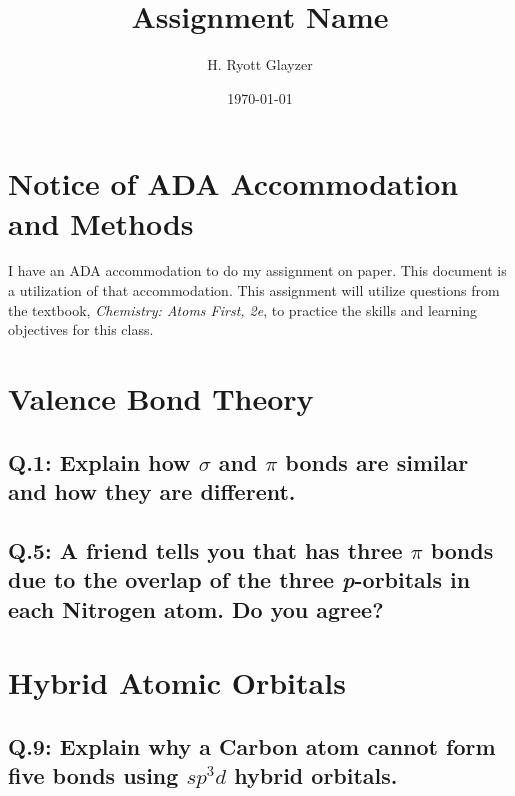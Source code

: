 \documentclass[11pt, letterpaper]{article}
\begin{document}


\title{Assignment Name}
\author{H. Ryott Glayzer}
\date{\today}


\maketitle


\section*{Notice of ADA Accommodation and Methods}
I have an ADA accommodation to do my assignment on paper.
This document is a utilization of that accommodation.
This assignment will utilize questions from the textbook,
\textit{Chemistry: Atoms First, 2e}, to practice the skills
and learning objectives for this class.

\section{Valence Bond Theory}

\subsection*{Q.1: Explain how $\sigma$ and $\pi$ bonds are similar and how they are different.}


\subsection*{Q.5: A friend tells you that  has three $\pi$ bonds due to the
overlap of the three \textit{p}-orbitals in each Nitrogen atom. Do you agree?}


\section{Hybrid Atomic Orbitals}

\subsection*{Q.9: Explain why a Carbon atom cannot form five bonds using $sp^{3}d$
hybrid orbitals.}
\end{document}

